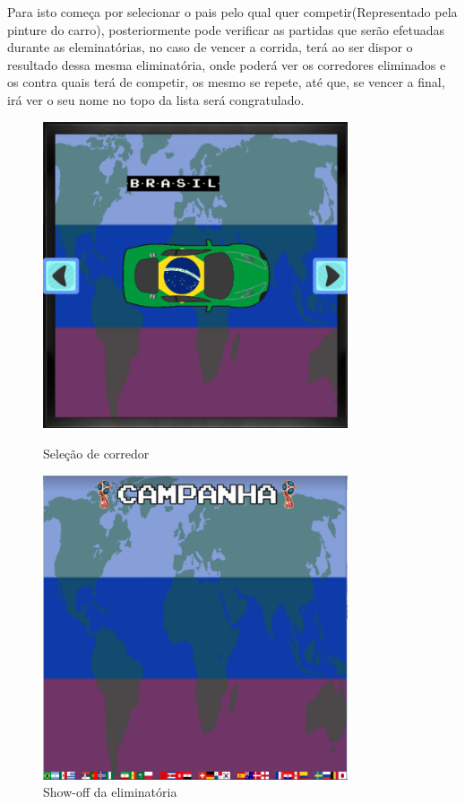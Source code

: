 \documentclass[a4paper]{report} %
\begin{document}
Para isto começa por selecionar o pais pelo qual quer competir(Representado pela pinture do carro),
posteriormente pode verificar as partidas que serão efetuadas durante as eleminatórias, no caso de vencer a corrida, terá ao ser dispor o resultado dessa mesma eliminatória, onde poderá ver os corredores eliminados e os contra quais terá de competir, os mesmo se repete, até que, se vencer a final, irá ver o seu nome no topo da lista será congratulado.

\begin{figure}[tb]
\begin{center}
\includegraphics[width=9cm]{Sele__o.PNG}
\end{center}
\caption{Seleção de corredor}
\begin{center}
\includegraphics[width=9cm]{Inicio_Campanha.PNG}
\end{center}
\caption{Show-off da eliminatória}
\end{figure}
\end{document}
